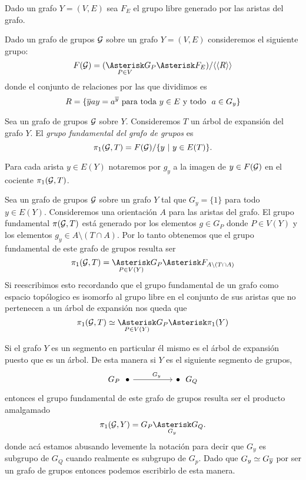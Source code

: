 \documentclass[tesis.tex]{subfiles}
\begin{document}
Dado un grafo $Y = (V, E)$ sea $F_{E}$ el grupo libre generado por las aristas del grafo.

\begin{deff}
	Dado un grafo de grupos $\cal G$ sobre un grafo $Y = (V, E)$ consideremos el siguiente grupo: 
	\begin{equation*}
		F({\cal G}) = (\underset{P \in V}{\Asterisk} G_P \Asterisk F_{E}) / \langle \langle  R \rangle \rangle
	\end{equation*}
	donde el conjunto de relaciones por las que dividimos es 
	\[
		R = \{  \overline y a y = a^{\overline y}   \ \text{para toda $y \in E$ y todo \  $a \in G_y$} \}
	\]
\end{deff}


\begin{deff} \label{def_pi1_arbol}
	Sea un grafo de grupos $\cal G$ sobre $Y$.
	Consideremos $T$ un árbol de expansión del grafo $Y$.
	El \emph{grupo fundamental del grafo de grupos} es
	\begin{equation*}
		\pi_1({\cal G}, T) = F({\cal G}) / \{ y \  | \ y \in E(T)  \}.
	\end{equation*}
\end{deff}

\begin{obs}
	Para cada arista $y \in E(Y)$ notaremos por $g_{y}$ a la imagen de $y \in F({\cal G})$ en el cociente $\pi_1({\cal G},T)$.
\end{obs}

\begin{ej}
	Sea un grafo de grupos $\cal G$ sobre un grafo $Y$ tal que $G_y = \{ 1 \}$ para todo $y \in E(Y)$.
	Consideremos una orientación $A$ para las aristas del grafo.
	El grupo fundamental $\pi({\cal G}, T)$ está generado por los elementos $g \in G_P$ donde $P \in V(Y)$ y los elementos $g_y \in A \setminus (T \cap A)$.
	Por lo tanto obtenemos que el grupo fundamental de este grafo de grupos resulta ser
	\[
	\pi_1({\cal G}, T) = \underset{P \in V(Y)}{\Asterisk} G_P \Asterisk F_{A \setminus (T \cap A)}
	\]
	Si reescribimos esto recordando que el grupo fundamental de un grafo como espacio topólogico es isomorfo al grupo libre en el conjunto de sus aristas que no pertenecen a un árbol de expansión nos queda que 
	\[
		\pi_1({\cal G}, T) \simeq \underset{P \in V(Y)}{\Asterisk} G_P  \Asterisk \pi_1(Y) 
	\]
\end{ej}

\begin{ej}\label{ej_pi1_segmento}
	Si el grafo $Y$ es un segmento en particular él mismo es el árbol de expansión puesto que es un árbol.
	De esta manera si $Y$ es el siguiente segmento de grupos,
	\[\begin{tikzcd}
		{G_P \ \ \bullet} && {\bullet \ \ G_Q}
		\arrow["G_y"{pos=0.6}, from=1-1, to=1-3]
	\end{tikzcd}\]
	entonces el grupo fundamental de este grafo de grupos resulta ser el producto amalgamado
	\[
	\pi_1({\cal G}, Y) = G_P \underset{G_{y}}{\Asterisk} G_Q.
	\]
	donde acá estamos abusando levemente la notación para decir que $G_{y}$ es subgrupo de $G_{Q}$ cuando realmente es subgrupo de $G_{p}$.
	Dado que $G_{y} \simeq G_{\overline y}$ por ser un grafo de grupos entonces podemos escribirlo de esta manera.
\end{ej}
\end{document}
